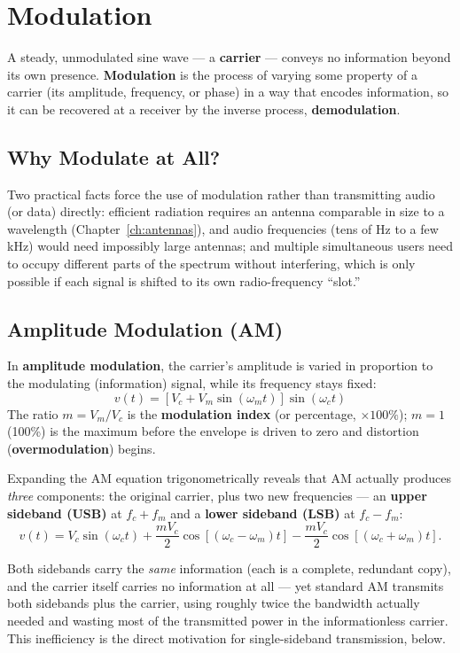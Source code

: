 \chapter{Modulation}
\label{ch:modulation}

A steady, unmodulated sine wave --- a \textbf{carrier} --- conveys no
information beyond its own presence. \textbf{Modulation} is the process
of varying some property of a carrier (its amplitude, frequency, or
phase) in a way that encodes information, so it can be recovered at a
receiver by the inverse process, \textbf{demodulation}.

\section{Why Modulate at All?}

Two practical facts force the use of modulation rather than transmitting
audio (or data) directly: efficient radiation requires an antenna
comparable in size to a wavelength (Chapter~\ref{ch:antennas}), and audio
frequencies (tens of Hz to a few kHz) would need impossibly large
antennas; and multiple simultaneous users need to occupy different parts
of the spectrum without interfering, which is only possible if each
signal is shifted to its own radio-frequency ``slot.''

\section{Amplitude Modulation (AM)}

In \textbf{amplitude modulation}, the carrier's amplitude is varied in
proportion to the modulating (information) signal, while its frequency
stays fixed:
\[
v(t) = \left[V_c + V_m\sin(\omega_m t)\right]\sin(\omega_c t)
\]
The ratio $m = V_m/V_c$ is the \textbf{modulation index} (or
percentage, $\times100\%$); $m=1$ (100\%) is the maximum before the
envelope is driven to zero and distortion (\textbf{overmodulation})
begins.

Expanding the AM equation trigonometrically reveals that AM actually
produces \emph{three} components: the original carrier, plus two new
frequencies --- an \textbf{upper sideband (USB)} at $f_c+f_m$ and a
\textbf{lower sideband (LSB)} at $f_c-f_m$:
\[
v(t) = V_c\sin(\omega_c t) + \frac{mV_c}{2}\cos\!\left[(\omega_c-\omega_m)t\right] - \frac{mV_c}{2}\cos\!\left[(\omega_c+\omega_m)t\right].
\]

\begin{keyidea}
Both sidebands carry the \emph{same} information (each is a complete,
redundant copy), and the carrier itself carries no information at all
--- yet standard AM transmits both sidebands plus the carrier, using
roughly twice the bandwidth actually needed and wasting most of the
transmitted power in the informationless carrier. This inefficiency is
the direct motivation for single-sideband transmission, below.
\end{keyidea}

